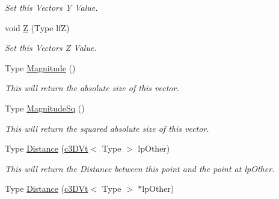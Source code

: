 \begin{DoxyCompactItemize}
\begin{DoxyCompactList}\small\item\em Set this Vectors Y Value. \end{DoxyCompactList}\item 
\hypertarget{classc3_d_vt_a23ad6c598963c1891fad05c6687d3d76}{
void \hyperlink{classc3_d_vt_a23ad6c598963c1891fad05c6687d3d76}{Z} (Type lfZ)}
\label{classc3_d_vt_a23ad6c598963c1891fad05c6687d3d76}

\begin{DoxyCompactList}\small\item\em Set this Vectors Z Value. \end{DoxyCompactList}\item 
\hypertarget{classc3_d_vt_af8df11dbf7dfdf2d5f9379febed52183}{
Type \hyperlink{classc3_d_vt_af8df11dbf7dfdf2d5f9379febed52183}{Magnitude} ()}
\label{classc3_d_vt_af8df11dbf7dfdf2d5f9379febed52183}

\begin{DoxyCompactList}\small\item\em This will return the absolute size of this vector. \end{DoxyCompactList}\item 
\hypertarget{classc3_d_vt_a400d4c58994c0bea04edd265d89dbff9}{
Type \hyperlink{classc3_d_vt_a400d4c58994c0bea04edd265d89dbff9}{MagnitudeSq} ()}
\label{classc3_d_vt_a400d4c58994c0bea04edd265d89dbff9}

\begin{DoxyCompactList}\small\item\em This will return the squared absolute size of this vector. \end{DoxyCompactList}\item 
\hypertarget{classc3_d_vt_aa156f5c5015c4bfda55017a1612020df}{
Type \hyperlink{classc3_d_vt_aa156f5c5015c4bfda55017a1612020df}{Distance} (\hyperlink{classc3_d_vt}{c3DVt}$<$ Type $>$ lpOther)}
\label{classc3_d_vt_aa156f5c5015c4bfda55017a1612020df}

\begin{DoxyCompactList}\small\item\em This will return the Distance between this point and the point at lpOther. \end{DoxyCompactList}\item 
\hypertarget{classc3_d_vt_af578c449d7b541de26ef005b03784a52}{
Type \hyperlink{classc3_d_vt_af578c449d7b541de26ef005b03784a52}{Distance} (\hyperlink{classc3_d_vt}{c3DVt}$<$ Type $>$ $\ast$lpOther)}
\label{classc3_d_vt_af578c449d7b541de26ef005b03784a52}


\end{DoxyCompactItemize}
